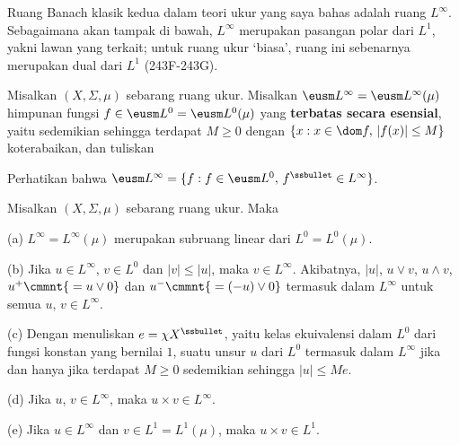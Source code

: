      
\def\chaptername{Ruang fungsi}
\def\sectionname{$L^{\infty}$}
     
     
Ruang Banach klasik kedua dalam teori ukur yang saya bahas adalah ruang
$L^{\infty}$. Sebagaimana akan tampak di bawah, $L^{\infty}$ merupakan
pasangan polar dari $L^1$, yakni lawan yang terkait; untuk ruang ukur
`biasa', ruang ini sebenarnya merupakan dual dari $L^1$ (243F-243G).
     
 Misalkan $(X,\Sigma,\mu)$ sebarang ruang ukur.
Misalkan $\eusm L^{\infty}=\eusm L^{\infty}(\mu)$ himpunan fungsi
$f\in\eusm L^0=\eusm L^0(\mu)$ yang {\bf terbatas secara esensial}, yaitu
sedemikian sehingga terdapat $M\ge 0$ dengan
$\{x:x\in\dom f,\,|f(x)|\le M\}$ koterabaikan, dan tuliskan
     
     
Perhatikan bahwa
$\eusm L^{\infty}=\{f:f\in\eusm L^0,\,f^{\ssbullet}\in L^{\infty}\}$.
     
 Misalkan $(X,\Sigma,\mu)$ sebarang ruang ukur. Maka
     
(a) $L^{\infty}=L^{\infty}(\mu)$ merupakan subruang linear dari
$L^0=L^0(\mu)$.
     
(b) Jika $u\in L^{\infty}$, $v\in L^0$ dan $|v|\le|u|$, maka
$v\in L^{\infty}$. Akibatnya, $|u|$, $u\vee v$, $u\wedge v$,
$u^+\cmmnt{\mskip5mu =u\vee 0}$ dan $u^-\cmmnt{\mskip5mu =(-u)\vee 0}$
termasuk dalam $L^{\infty}$ untuk semua $u$, $v\in L^{\infty}$.
     
(c) Dengan menuliskan $e=\chi X^{\ssbullet}$, yaitu kelas ekuivalensi
dalam $L^0$ dari fungsi konstan yang bernilai $1$, suatu unsur $u$ dari
$L^0$ termasuk dalam $L^{\infty}$ jika dan hanya jika terdapat $M\ge 0$
sedemikian sehingga $|u|\le Me$.
     
(d) Jika $u$, $v\in L^{\infty}$, maka $u\times v\in L^{\infty}$.
     
(e) Jika $u\in L^{\infty}$ dan $v\in L^1=L^1(\mu)$, maka
$u\times v\in L^1$.
     
